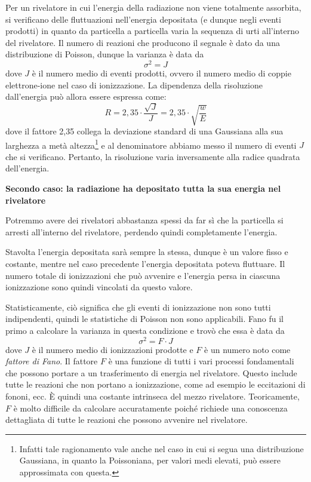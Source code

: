 Per un rivelatore in cui l'energia della radiazione non viene totalmente assorbita, si verificano delle fluttuazioni nell'energia depositata (e dunque negli eventi prodotti) in quanto da particella a particella varia la sequenza di urti all'interno del rivelatore. Il numero di reazioni che producono il segnale è dato da una distribuzione di Poisson, dunque la varianza è data da
\begin{equation*}
   \sigma^2 = J
\end{equation*}
dove $J$ è il numero medio di eventi prodotti, ovvero il numero medio di coppie elettrone-ione nel caso di ionizzazione. La dipendenza della risoluzione dall'energia può allora essere espressa come:
\begin{equation*}
   R
   =2,35 \cdot \frac{\sqrt{J}}{J}
   =2,35 \cdot \sqrt{\frac{w}{E}}
\end{equation*}
dove il fattore 2,35 collega la deviazione standard di una Gaussiana alla sua larghezza a metà altezza\footnote{Infatti tale ragionamento vale anche nel caso in cui si segua una distribuzione Gaussiana, in quanto la Poissoniana, per valori medi elevati, può essere approssimata con questa.} e al denominatore abbiamo messo il numero di eventi $J$ che si verificano. Pertanto, la risoluzione varia inversamente alla radice quadrata dell'energia.

\vspace{0.2cm}\textbf{Secondo caso: la radiazione ha depositato tutta la sua energia nel rivelatore}

Potremmo avere dei rivelatori abbastanza spessi da far sì che la particella si arresti all'interno del rivelatore, perdendo quindi completamente l'energia.

Stavolta l'energia depositata sarà sempre la stessa, dunque è un valore fisso e costante, mentre nel caso precedente l'energia depositata poteva fluttuare. Il numero totale di ionizzazioni che può avvenire e l'energia persa in ciascuna ionizzazione sono quindi vincolati da questo valore.

Statisticamente, ciò significa che gli eventi di ionizzazione non sono tutti indipendenti, quindi le statistiche di Poisson non sono applicabili. Fano fu il primo a calcolare la varianza in questa condizione e trovò che essa è data da
\begin{equation*}
   \sigma^2 = F \cdot J
\end{equation*}
dove $J$ è il numero medio di ionizzazioni prodotte e $F$ è un numero noto come \textit{fattore di Fano}. Il fattore $F$ è una funzione di tutti i vari processi fondamentali che possono portare a un trasferimento di energia nel rivelatore. Questo include tutte le reazioni che non portano a ionizzazione, come ad esempio le eccitazioni di fononi, ecc. È quindi una costante intrinseca del mezzo rivelatore. Teoricamente, $F$ è molto difficile da calcolare accuratamente poiché richiede una conoscenza dettagliata di tutte le reazioni che possono avvenire nel rivelatore.

